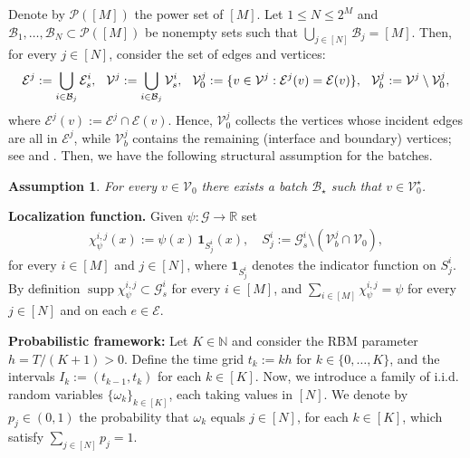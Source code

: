 \documentclass[a4paper, 10pt, english]{article}
\def\R{\mathbb R}
\def\N{\mathbb N}
\def\to{\rightarrow}
\newtheorem{assumption}{Assumption}
\begin{document}
Denote by $ \mathcal{P}([M])$ the power set of $[M]$. Let $1\leq N\leq 2^M$ and $\mathcal{B}_1, \dots, \mathcal{B}_N\subset \mathcal{P}([M])$ be nonempty sets such that $\bigcup_{j\in [N]} \mathcal{B}_j = [M].$ Then, for every $j\in [N]$, consider the set of edges and vertices:
\begin{align}\label{eq:random_graph_intro}
  \mathcal{E}^j := \bigcup_{i\in\mathcal B_{j}}\mathcal{E}_s^i,
  \hspace{0.25cm}
  \mathcal{V}^j := \bigcup_{i\in\mathcal B_{j}}\mathcal{V}_s^i, \hspace{0.25cm}
  \mathcal{V}_0^j:=\{v\in\mathcal{V}^j : \mathcal{E}^j(v)=\mathcal{E}(v)\},
  \hspace{0.25cm}
  \mathcal{V}_b^j:=\mathcal{V}^j\setminus\mathcal{V}_0^j,
\end{align}
where $\mathcal{E}^j(v):=\mathcal{E}^j\cap \mathcal{E}(v)$. Hence, $\mathcal{V}_0^j$ collects the vertices whose incident edges are all in $\mathcal{E}^j$, while $\mathcal{V}_b^j$ contains the remaining (interface and boundary) vertices; see  and . Then, we have the following structural assumption for the batches.
\begin{assumption}\label{assump:A1}
    For every $v\in \mathcal{V}_0$ there exists a batch $\mathcal{B}_\star$ such that $v\in \mathcal{V}^\star_0$.
\end{assumption}
\smallskip\noindent\textbf{Localization function.}
Given $\psi:\mathcal{G}\to\R$ set
\begin{align}\label{eq:def_Si}
   \chi_\psi^{i,j}(x):=\psi(x)\,\mathbf 1_{S^i_j}(x), \quad  S^i_j:=\mathcal{G}^i_s\setminus(\mathcal{V}_{b}^j\cap\mathcal{V}_0),
\end{align}
for every $i\in[M]$ and $ j\in[N]$, where $\mathbf 1_{S^i_j}$ denotes the indicator function on $S^i_j$. By definition $\operatorname{supp}\chi_\psi^{i,j}\subset\mathcal{G}_s^i$ for every $i\in[M]$, and $\sum_{i\in [M]}\chi_\psi^{i,j}=\psi$ for every $j\in [N]$ and   on each $ e\in\mathcal{E}$.
\medbreak

\noindent
{\bf Probabilistic framework:} Let $K \in \N$ and consider the RBM parameter $h = T/(K + 1) > 0$. Define the time grid $t_k:=k h$ for $k\in\{0,\dots,K\}$, and the intervals $I_k:=(t_{k-1},t_k)$ for each $k\in[K]$. Now, we introduce a family of i.i.d. random variables $\{\omega_k\}_{k\in[K]}$, each taking values in $[N]$. We denote by $p_j \in (0,1)$ the probability that $\omega_k$ equals $j \in [N]$, for each $k \in [K]$, which satisfy $\sum_{j\in [N]} p_j = 1$. 
\medbreak
\end{document}

